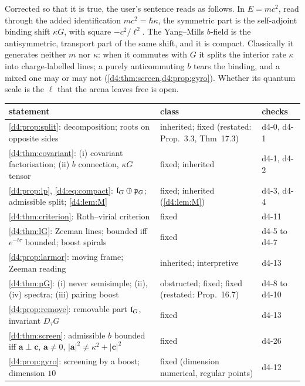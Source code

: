 Corrected so that it is true, the user's sentence reads as follows. In $E=mc^2$, read through the added identification $mc^2=\hbar\kappa$, the
symmetric part is the self-adjoint binding shift $\kappa G$, with square $-c^2/\ell^2$. The Yang--Mills $b$-field is the antisymmetric, transport
part of the same shift, and it is compact. Classically it generates neither $m$ nor $\kappa$: when it commutes with $G$ it splits the interior
rate $\kappa$ into charge-labelled lines; a purely anticommuting $b$ tears the binding, and a mixed one may or may not
(\cref{d4:thm:screen,d4:prop:gyro}). Whether its quantum scale is the $\ell$ that the arena leaves free is open.

\begin{table}[t]
\centering
\footnotesize
\begin{tabular}{@{}>{\raggedright\arraybackslash}p{8.0cm}>{\raggedright\arraybackslash}p{5.1cm}>{\raggedright\arraybackslash}p{2.0cm}@{}}
\toprule
statement & class & checks\\
\midrule
\cref{d4:prop:split}: decomposition; roots on opposite sides & inherited; fixed (restated: Prop.~3.3, Thm~17.3) & d4-0, d4-1\\
\cref{d4:thm:covariant}: (i) covariant factorisation; (ii) $b$ connection, $\kappa G$ tensor & fixed; inherited & d4-1, d4-2\\
\cref{d4:prop:lp}, \eqref{d4:eq:compact}: $\mathfrak l_G\oplus\mathfrak p_G$; admissible split; \cref{d4:lem:M} & fixed; inherited (\cref{d4:lem:M}) & d4-3, d4-4\\
\cref{d4:thm:criterion}: Roth--virial criterion & fixed & d4-11\\
\cref{d4:thm:lG}: Zeeman lines; bounded iff $e^{-b\tau}$ bounded; boost spirals & fixed & d4-5 to d4-7\\
\cref{d4:prop:larmor}: moving frame; Zeeman reading & inherited; interpretive & d4-13\\
\cref{d4:thm:pG}: (i) never semisimple; (ii), (iv) spectra; (iii) pairing boost & obstructed; fixed; fixed (restated: Prop.~16.7) & d4-8 to d4-10\\
\cref{d4:prop:remove}: removable part $\mathfrak l_G$, invariant $D_\tau G$ & fixed & d4-13\\
\cref{d4:thm:screen}: admissible $b$ bounded iff $\mathbf a\perp\mathbf c$, $\mathbf a\neq0$, $|\mathbf a|^2\neq\kappa^2+|\mathbf c|^2$ & fixed & d4-26\\
\cref{d4:prop:gyro}: screening by a boost; dimension $10$ & fixed (dimension numerical, regular points) & d4-12\\

\end{tabular}
\end{table}
